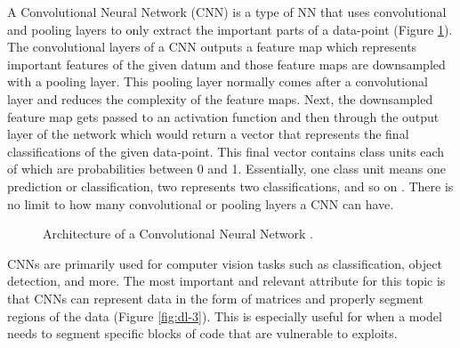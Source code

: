 \documentclass[12pt,twocolumn,letterpaper]{article}
\begin{document}
A Convolutional Neural Network (CNN) is a type of NN that uses convolutional and pooling layers to only 
extract the important parts of a data-point (Figure \ref{fig:dl-2}). The convolutional layers of a CNN outputs a feature map which 
represents important features of the given datum and those feature maps are downsampled with a pooling layer. 
This pooling layer normally comes after a convolutional layer and reduces the complexity of the feature maps. 
Next, the downsampled feature map gets passed to an activation function and then through the output layer of the 
network which would return a vector that represents the final classifications of the given data-point. This final 
vector contains class units each of which are probabilities between 0 and 1. Essentially, one class unit means 
one prediction or classification, two represents two classifications, and so on \cite{Lin20}. There is no 
limit to how many convolutional or pooling layers a CNN can have.

\begin{figure}[h]
    \centering

    \caption{Architecture of a Convolutional Neural Network \cite{Lin20}.}
    \label{fig:dl-2}
\end{figure}

CNNs are primarily used for computer vision tasks such as classification, object detection, and more. 
The most important and relevant attribute for this topic is that CNNs can represent data in the form of 
matrices and properly segment regions of the data (Figure \ref{fig:dl-3}). This is especially useful for when a model needs to segment 
specific blocks of code that are vulnerable to exploits. 
\end{document}
